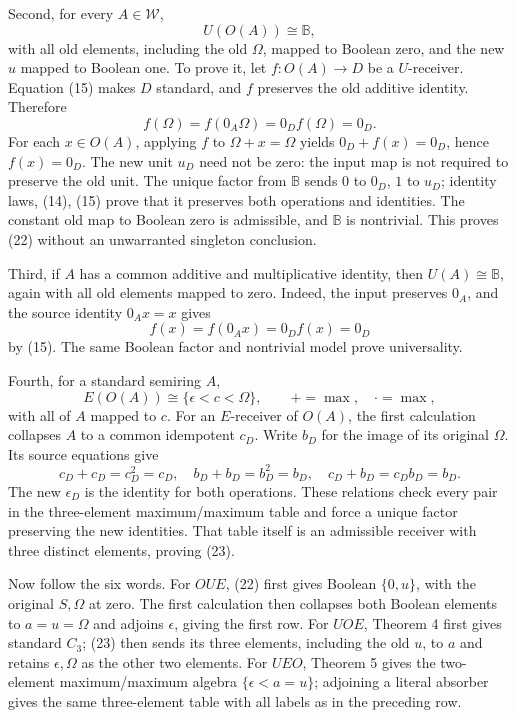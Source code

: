 \documentclass[
]{article}
\begin{document}
Second, for every \(A\in\mathcal W\), \[
U(O(A))\cong\mathbb B,
\tag{22}
\] with all old elements, including the old \(\Omega\), mapped to
Boolean zero, and the new \(u\) mapped to Boolean one. To prove it, let
\(f:O(A)\to D\) be a \(U\)-receiver. Equation (15) makes \(D\) standard,
and \(f\) preserves the old additive identity. Therefore \[
f(\Omega)=f(0_A\Omega)=0_Df(\Omega)=0_D.
\] For each \(x\in O(A)\), applying \(f\) to \(\Omega+x=\Omega\) yields
\(0_D+f(x)=0_D\), hence \(f(x)=0_D\). The new unit \(u_D\) need not be
zero: the input map is not required to preserve the old unit. The unique
factor from \(\mathbb B\) sends \(0\) to \(0_D\), \(1\) to \(u_D\);
identity laws, (14), (15) prove that it preserves both operations and
identities. The constant old map to Boolean zero is admissible, and
\(\mathbb B\) is nontrivial. This proves (22) without an unwarranted
singleton conclusion.

Third, if \(A\) has a common additive and multiplicative identity, then
\(U(A)\cong\mathbb B\), again with all old elements mapped to zero.
Indeed, the input preserves \(0_A\), and the source identity \(0_Ax=x\)
gives \[
f(x)=f(0_Ax)=0_Df(x)=0_D
\] by (15). The same Boolean factor and nontrivial model prove
universality.

Fourth, for a standard semiring \(A\), \[
E(O(A))\cong\{\epsilon<c<\Omega\},
\qquad +=\max,\quad\cdot=\max,
\tag{23}
\] with all of \(A\) mapped to \(c\). For an \(E\)-receiver of \(O(A)\),
the first calculation collapses \(A\) to a common idempotent \(c_D\).
Write \(b_D\) for the image of its original \(\Omega\). Its source
equations give \[
c_D+c_D=c_D^2=c_D,\quad
b_D+b_D=b_D^2=b_D,\quad c_D+b_D=c_Db_D=b_D.
\] The new \(\epsilon_D\) is the identity for both operations. These
relations check every pair in the three-element maximum/maximum table
and force a unique factor preserving the new identities. That table
itself is an admissible receiver with three distinct elements, proving
(23).

Now follow the six words. For \(OUE\), (22) first gives Boolean
\(\{0,u\}\), with the original \(S,\Omega\) at zero. The first
calculation then collapses both Boolean elements to \(a=u=\Omega\) and
adjoins \(\epsilon\), giving the first row. For \(UOE\), Theorem 4 first
gives standard \(C_3\); (23) then sends its three elements, including
the old \(u\), to \(a\) and retains \(\epsilon,\Omega\) as the other two
elements. For \(UEO\), Theorem 5 gives the two-element maximum/maximum
algebra \(\{\epsilon<a=u\}\); adjoining a literal absorber gives the
same three-element table with all labels as in the preceding row.
\end{document}
